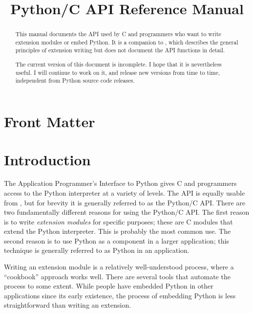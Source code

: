 \documentclass{manual}
\title{Python/C API Reference Manual}
\begin{document}
\maketitle

\ifhtml
\chapter*{Front Matter\label{front}}
\fi



\begin{abstract}

\noindent
This manual documents the API used by C and \Cpp{} programmers who
want to write extension modules or embed Python.  It is a companion to
, which describes the general principles of extension
writing but does not document the API functions in detail.

 The current version of this document is incomplete.
I hope that it is nevertheless useful.  I will continue to work on it,
and release new versions from time to time, independent from Python
source code releases.

\end{abstract}

\tableofcontents


\chapter{Introduction \label{intro}}

The Application Programmer's Interface to Python gives C and
\Cpp{} programmers access to the Python interpreter at a variety of
levels.  The API is equally usable from \Cpp{}, but for brevity it is
generally referred to as the Python/C API.  There are two
fundamentally different reasons for using the Python/C API.  The first
reason is to write \emph{extension modules} for specific purposes;
these are C modules that extend the Python interpreter.  This is
probably the most common use.  The second reason is to use Python as a
component in a larger application; this technique is generally
referred to as  Python in an application.

Writing an extension module is a relatively well-understood process, 
where a ``cookbook'' approach works well.  There are several tools 
that automate the process to some extent.  While people have embedded 
Python in other applications since its early existence, the process of 
embedding Python is less straightforward than writing an extension.  
\end{document}
